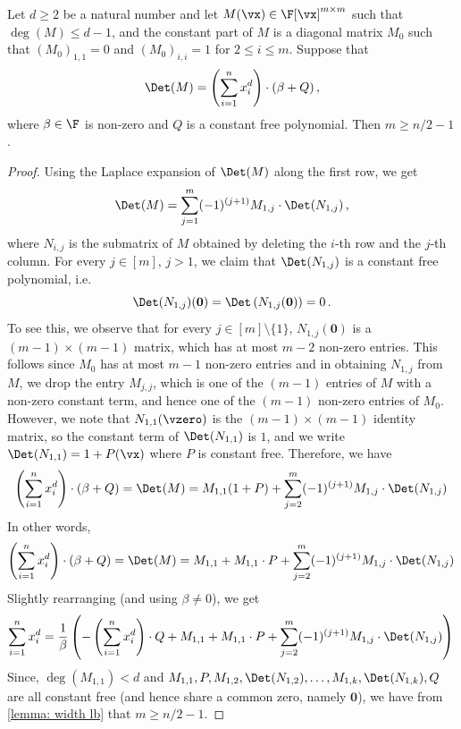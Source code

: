 \begin{lemma}\label{lem: n/2 lb for higher deg entries}
Let $d \ge 2$ be a natural number and let $M(\vx) \in \F[\vx]^{m \times m}$ such that $\deg(M) \le d-1$, and the constant part of $M$ is a diagonal matrix $M_0$ such that $(M_0)_{1,1}=0$ and $(M_0)_{i,i}=1$ for $2 \le i \le m$.  Suppose that
\[
\Det(M) = \left(\sum_{i = 1}^n x_i^d\right) \cdot (\beta + Q) \, , 
\]
where $\beta \in \F$ is non-zero and $Q$ is a constant free polynomial. Then $m \geq n/2-1$. 
\end{lemma}
\begin{proof}
 Using the Laplace expansion of $\Det(M)$ along the first row, we get 
\[
\Det(M) = \sum_{j=1}^m (-1)^{(j + 1)}M_{1, j}\cdot \Det (N_{1, j}) \, ,
\]
where $N_{i, j}$ is the submatrix of $M$ obtained by deleting the $i$-th row and the $j$-th column. For every $j \in [m]$, $j > 1$, we claim that $\Det(N_{1, j})$ is a constant free polynomial, i.e. \[
\Det(N_{1, j})(\mathbf{0}) = \Det\left(N_{1, j}(\mathbf{0})\right) = 0 \, .
\] 
To see this, we observe that for every $j\in [m]\setminus \{1\}$, $N_{1, j}(\mathbf{0})$ is a $(m-1)\times (m-1)$ matrix, which has at most $m-2$ non-zero entries. This follows since $M_0$ has at most $m-1$ non-zero entries and in obtaining $N_{1, j}$ from $M$, we drop the entry $M_{j, j}$, which is one of the $(m-1)$ entries of $M$ with a non-zero constant term, and hence one of the $(m-1)$ non-zero entries of $M_0$. However, we note that $N_{1,1}(\vzero)$ is the $(m-1) \times (m-1)$ identity matrix, so the  constant term of $\Det(N_{1,1})$ is $1$, and we write  $\Det(N_{1,1}) = 1 + P(\vx)$ where $P$ is  constant free. Therefore, we have 
\[
\left(\sum_{i = 1}^n x_i^d\right)\cdot (\beta + Q) = \Det(M) = M_{1,1}(1 + P) + \sum_{j = 2}^m (-1)^{(j + 1)}M_{1, j}\cdot \Det(N_{1, j}) \, 
\]
In other words, 
\[
\left(\sum_{i = 1}^n x_i^d\right)\cdot (\beta + Q) = \Det(M) = M_{1,1} +  M_{1,1}\cdot P + \sum_{j = 2}^m (-1)^{(j + 1)}M_{1, j}\cdot \Det(N_{1, j}) \, 
\]
Slightly rearranging (and using $\beta \neq 0$), we get
\[
\sum_{i = 1}^n x_i^d = \frac{1}{\beta}\left(-\left(\sum_{i = 1}^n x_i^d\right)\cdot Q + M_{1,1} +  M_{1,1}\cdot P + \sum_{j = 2}^m (-1)^{(j + 1)}M_{1, j}\cdot \Det(N_{1, j})  \right)\, 
\]
Since, $\deg(M_{1,1}) < d$ and $M_{1,1}, P, M_{1, 2}, \Det(N_{1, 2}), \ldots, M_{1, k}, \Det(N_{1, k}), Q$ are all constant free (and hence share a common zero, namely $\mathbf{0}$), we have from \autoref{lemma: width lb} that $m \geq n/2-1$. 
\end{proof}


